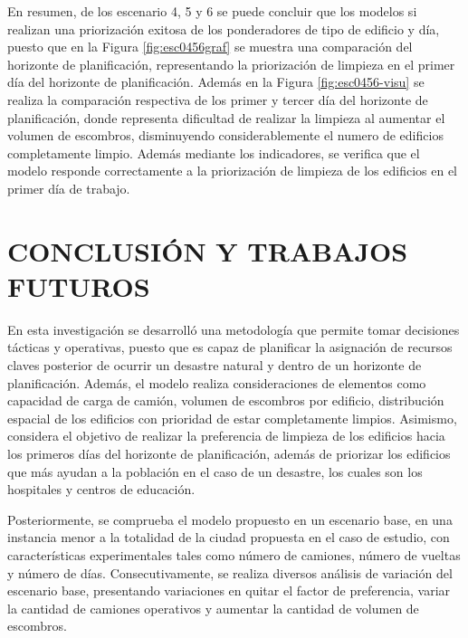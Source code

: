 \documentclass[12pt,a4paper]{article}
\begin{document}

\pagebreak

En resumen, de los escenario 4, 5 y 6 se puede concluir que los  modelos si realizan una priorización exitosa de los ponderadores de tipo de edificio y día, puesto que en la Figura \ref{fig:esc0456graf} se muestra una comparación del horizonte de planificación, representando la priorización de limpieza en el primer día del horizonte de planificación. Además en la Figura \ref{fig:esc0456-visu} se realiza la comparación respectiva de los primer y tercer día del horizonte de planificación, donde representa dificultad de realizar la limpieza al aumentar el volumen de escombros, disminuyendo considerablemente el numero de edificios completamente limpio. Además mediante los indicadores, se verifica que el modelo responde correctamente a la priorización de limpieza de los edificios en el primer día de trabajo.




\section{CONCLUSIÓN Y TRABAJOS FUTUROS}

En esta investigación se desarrolló una metodología que permite tomar decisiones tácticas y operativas, puesto que es capaz de planificar la asignación de recursos claves posterior de ocurrir un desastre natural y dentro de un horizonte de planificación. Además, el modelo realiza consideraciones de elementos como capacidad de carga de camión, volumen de escombros por edificio, distribución espacial de los edificios con prioridad de estar completamente limpios.  Asimismo, considera el objetivo de realizar la preferencia de limpieza de los edificios hacia los primeros días del horizonte de planificación, además de priorizar los edificios que más ayudan a la población en el caso de un desastre, los cuales son los hospitales y centros de educación.

Posteriormente, se comprueba el modelo propuesto en un escenario base, en una instancia menor a la totalidad de la ciudad propuesta en el caso de estudio, con características experimentales tales como número de camiones, número de vueltas y número de días. Consecutivamente, se realiza diversos análisis de variación del escenario base, presentando variaciones en quitar el factor de preferencia, variar la cantidad de camiones operativos y aumentar la cantidad de volumen de escombros. 
\end{document}
